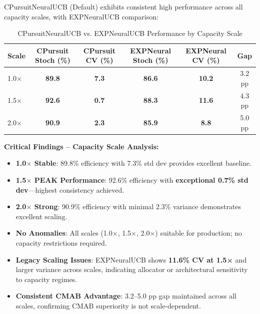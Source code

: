 \documentclass[12pt,a4paper]{article}
\newcommand{\success}[1]{\textcolor{accentgreen}{\textbf{#1}}}
\newcommand{\legacy}[1]{\textcolor{legacycolor}{\textbf{#1}}}
\begin{document}
CPursuitNeuralUCB (Default) exhibits consistent high performance across all capacity scales, with EXPNeuralUCB comparison:

\begin{table}[H]
\centering
\caption{CPursuitNeuralUCB vs. EXPNeuralUCB Performance by Capacity Scale}
\begin{tabular}{@{}lccccc@{}}
\toprule
\textbf{Scale} & \textbf{CPursuit Stoch (\%)} & \textbf{CPursuit CV (\%)} & \textbf{EXPNeural Stoch (\%)} & \textbf{EXPNeural CV (\%)} & \textbf{Gap} \\
\midrule
1.0$\times$ & \success{89.8} & \success{7.3} & \legacy{86.6} & \legacy{10.2} & 3.2 pp \\
1.5$\times$ & \success{92.6} & \success{0.7} & \legacy{88.3} & \legacy{11.6} & 4.3 pp \\
2.0$\times$ & \success{90.9} & \success{2.3} & \legacy{85.9} & \legacy{8.8} & 5.0 pp \\
\bottomrule
\end{tabular}
\end{table}

\textbf{Critical Findings – Capacity Scale Analysis:}

\begin{itemize}
    \item \success{1.0$\times$ Stable}: 89.8\% efficiency with 7.3\% std dev provides excellent baseline.
    
    \item \success{1.5$\times$ PEAK Performance}: 92.6\% efficiency with \textbf{exceptional 0.7\% std dev}—highest consistency achieved. 
    
    \item \success{2.0$\times$ Strong}: 90.9\% efficiency with minimal 2.3\% variance demonstrates excellent scaling.
    
    \item \success{No Anomalies}: All scales (1.0$\times$, 1.5$\times$, 2.0$\times$) suitable for production; no capacity restrictions required.
    
    \item \legacy{Legacy Scaling Issues}: EXPNeuralUCB shows \legacy{11.6\% CV at 1.5×} and larger variance across scales, indicating allocator or architectural sensitivity to capacity regimes.
    
    \item \success{Consistent CMAB Advantage}: 3.2--5.0 pp gap maintained across all scales, confirming CMAB superiority is not scale-dependent.
\end{itemize}
\end{document}
